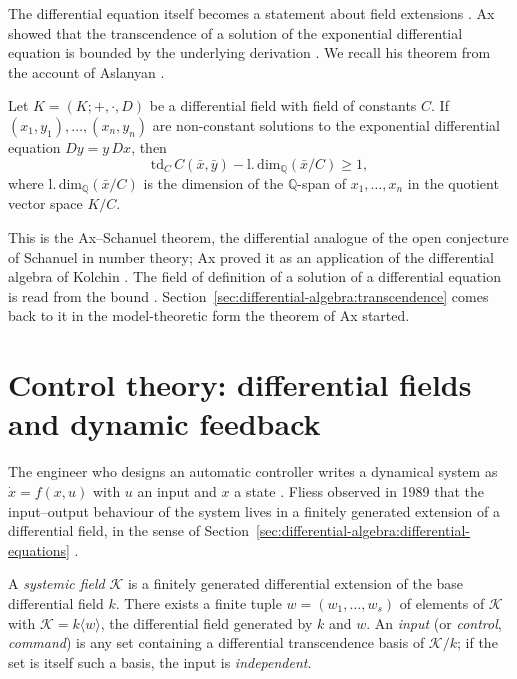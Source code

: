 The differential equation itself becomes a statement about field extensions
\cite{Ax1971}.
Ax showed that the transcendence of a solution of the exponential differential
equation is bounded by the underlying derivation \cite[Theorem~3]{Ax1971}.
We recall his theorem from the account of Aslanyan \cite{Aslanyan2018}.

\begin{theorem}\label{thm:diffalg:ax-schanuel}
Let $K=(K;+,\cdot,D)$ be a differential field with field of constants $C$. If
$(x_1,y_1),\ldots,(x_n,y_n)$ are non-constant solutions to the exponential
differential equation $Dy=y\,Dx$, then
\[
\mathrm{td}_C\,C(\bar{x},\bar{y}) - \mathrm{l.\,dim}_{\mathbb{Q}}(\bar{x}/C) \geq 1,
\]
where $\mathrm{l.\,dim}_{\mathbb{Q}}(\bar{x}/C)$ is the dimension of the
$\mathbb{Q}$-span of $x_1,\ldots,x_n$ in the quotient vector space $K/C$.
\end{theorem}

This is the Ax--Schanuel theorem, the differential analogue of the open
conjecture of Schanuel in number theory; Ax \cite{Ax1971} proved it as an
application of the differential algebra of Kolchin \cite{Kolchin1973}. The
field of definition of a solution of a differential equation is read from the
bound \cite[\S2]{Aslanyan2018}. Section~\ref{sec:differential-algebra:transcendence}
comes back to it in the model-theoretic form the theorem of Ax started.

\section{Control theory: differential fields and dynamic feedback}\label{sec:differential-algebra:control}

The engineer who designs an automatic controller writes a dynamical system as
$\dot x=f(x,u)$ with $u$ an input and $x$ a state \cite{Fliess1989}. Fliess observed in 1989 that
the input--output behaviour of the system lives in a finitely generated
extension of a differential field, in the sense of
Section~\ref{sec:differential-algebra:differential-equations} \cite{Fliess1989}.

\begin{definition}\label{def:diffalg:fliess-systemic-field}
A \emph{systemic field} $\mathcal{K}$ is a finitely generated differential
extension of the base differential field $k$. There exists a finite tuple
$w=(w_1,\ldots,w_s)$ of elements of $\mathcal{K}$ with
$\mathcal{K}=k\langle w\rangle$, the differential field generated by $k$ and
$w$. An \emph{input} (or \emph{control}, \emph{command}) is any set containing
a differential transcendence basis of $\mathcal{K}/k$; if the set is itself
such a basis, the input is \emph{independent}.
\end{definition}


